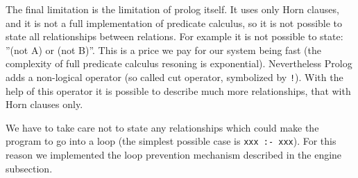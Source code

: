 \documentclass[a4paper]{article}
\begin{document}
The final limitation is the limitation of prolog itself. It uses only Horn clauses, and it is not a full implementation of predicate calculus, so it is not possible to state all relationships between relations. For example it is not possible to state: ''(not A) or (not B)''. This is a price we pay for our system being fast (the complexity of full predicate calculus resoning is exponential). Nevertheless Prolog adds a non-logical operator (so called cut operator, symbolized by \verb|!|). With the help of this operator it is possible to describe much more relationships, that with Horn clauses only. 

We have to take care not to state any relationships which could make the program to go into a loop (the simplest possible case is \verb|xxx :- xxx|). For this reason we implemented the loop prevention mechanism described in the engine subsection.
\end{document}
